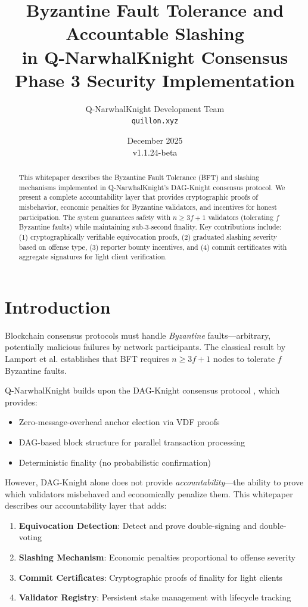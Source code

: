 \documentclass[11pt,a4paper]{article}
\title{\textbf{Byzantine Fault Tolerance and Accountable Slashing\\in Q-NarwhalKnight Consensus}\\[0.5em]
\large Phase 3 Security Implementation}
\author{Q-NarwhalKnight Development Team\\
\texttt{quillon.xyz}}
\date{December 2025\\v1.1.24-beta}
\begin{document}
\maketitle

\begin{abstract}
This whitepaper describes the Byzantine Fault Tolerance (BFT) and slashing mechanisms implemented in Q-NarwhalKnight's DAG-Knight consensus protocol. We present a complete accountability layer that provides cryptographic proofs of misbehavior, economic penalties for Byzantine validators, and incentives for honest participation. The system guarantees safety with $n \geq 3f + 1$ validators (tolerating $f$ Byzantine faults) while maintaining sub-3-second finality. Key contributions include: (1) cryptographically verifiable equivocation proofs, (2) graduated slashing severity based on offense type, (3) reporter bounty incentives, and (4) commit certificates with aggregate signatures for light client verification.
\end{abstract}

\section{Introduction}

Blockchain consensus protocols must handle \emph{Byzantine} faults---arbitrary, potentially malicious failures by network participants. The classical result by Lamport et al. \cite{lamport1982byzantine} establishes that BFT requires $n \geq 3f + 1$ nodes to tolerate $f$ Byzantine faults.

Q-NarwhalKnight builds upon the DAG-Knight consensus protocol \cite{dagknight2022}, which provides:
\begin{itemize}
    \item Zero-message-overhead anchor election via VDF proofs
    \item DAG-based block structure for parallel transaction processing
    \item Deterministic finality (no probabilistic confirmation)
\end{itemize}

However, DAG-Knight alone does not provide \emph{accountability}---the ability to prove which validators misbehaved and economically penalize them. This whitepaper describes our accountability layer that adds:

\begin{enumerate}
    \item \textbf{Equivocation Detection}: Detect and prove double-signing and double-voting
    \item \textbf{Slashing Mechanism}: Economic penalties proportional to offense severity
    \item \textbf{Commit Certificates}: Cryptographic proofs of finality for light clients
    \item \textbf{Validator Registry}: Persistent stake management with lifecycle tracking
\end{enumerate}
\end{document}
